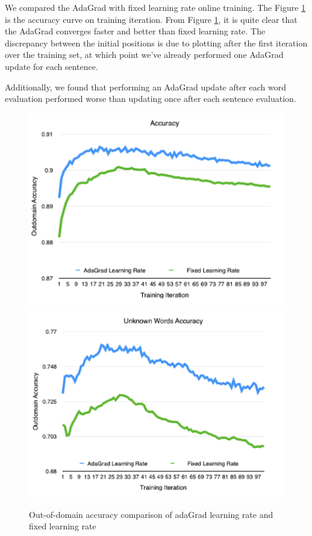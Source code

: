 \documentclass[11pt]{article}
\begin{document}
We compared the AdaGrad with fixed learning rate online training. The Figure \ref{Adagrad_fig} is the accuracy curve on training iteration. From Figure \ref{Adagrad_fig}, it is quite clear that the AdaGrad converges faster and better than fixed learning rate. The discrepancy between the initial positions is due to plotting after the first iteration over the training set, at which point we've already performed one AdaGrad update for each sentence.

Additionally, we found that performing an AdaGrad update after each word evaluation performed worse than updating once after each sentence evaluation.

\begin{figure}
	\includegraphics[scale=0.5]{outdomain_adagrad.png}
	\includegraphics[scale=0.5]{outdomain_adagrad_unkown.png}
	\caption{Out-of-domain accuracy  comparison of adaGrad learning rate and fixed learning rate}\label{Adagrad_fig}
\end{figure}
\end{document}
